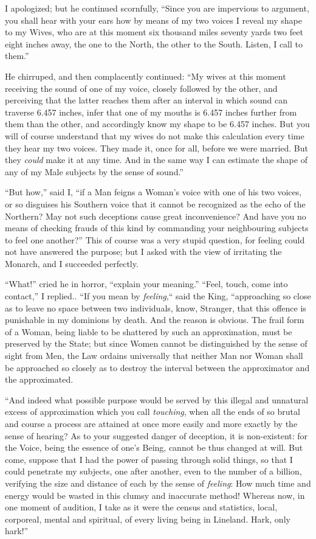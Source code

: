 \documentclass[10pt, kindle, oneside]{kindle}
\begin{document}
I apologized; but he continued scornfully, ``Since you are impervious to
argument, you shall hear with your ears how by means of my two voices I reveal
my shape to my Wives, who are at this moment six thousand miles seventy yards
two feet eight inches away, the one to the North, the other to the South.
Listen, I call to them.''

He chirruped, and then complacently continued: ``My wives at this moment
receiving the sound of one of my voice, closely followed by the other, and
perceiving that the latter reaches them after an interval in which sound can
traverse 6.457 inches, infer that one of my mouths is 6.457 inches further
from them than the other, and accordingly know my shape to be 6.457 inches.
But you will of course understand that my wives do not make this calculation
every time they hear my two voices. They made it, once for all, before we were
married. But they \emph{could} make it at any time. And in the same way I can
estimate the shape of any of my Male subjects by the sense of sound.''

``But how,'' said I, ``if a Man feigns a Woman's voice with one of his two
voices, or so disguises his Southern voice that it cannot be recognized as the
echo of the Northern? May not such deceptions cause great inconvenience? And
have you no means of checking frauds of this kind by commanding your
neighbouring subjects to feel one another?'' This of course was a very stupid
question, for feeling could not have answered the purpose; but I asked with
the view of irritating the Monarch, and I succeeded perfectly.

``What!'' cried he in horror, ``explain your meaning.'' ``Feel, touch, come into
contact,'' I replied.. ``If you mean by \emph{feeling},`` said the King, ``approaching so
close as to leave no space between two individuals, know, Stranger, that this
offence is punishable in my dominions by death. And the reason is obvious. The
frail form of a Woman, being liable to be shattered by such an approximation,
must be preserved by the State; but since Women cannot be distinguished by the
sense of sight from Men, the Law ordains universally that neither Man nor
Woman shall be approached so closely as to destroy the interval between the
approximator and the approximated.

``And indeed what possible purpose would be served by this illegal and
unnatural excess of approximation which you call \emph{touching}, when all the ends
of so brutal and course a process are attained at once more easily and more
exactly by the sense of hearing? As to your suggested danger of deception, it
is non-existent: for the Voice, being the essence of one's Being, cannot be
thus changed at will. But come, suppose that I had the power of passing
through solid things, so that I could penetrate my subjects, one after
another, even to the number of a billion, verifying the size and distance of
each by the sense of \emph{feeling}: How much time and energy would be wasted in this
clumsy and inaccurate method! Whereas now, in one moment of audition, I take
as it were the census and statistics, local, corporeal, mental and spiritual,
of every living being in Lineland. Hark, only hark!''
\end{document}
